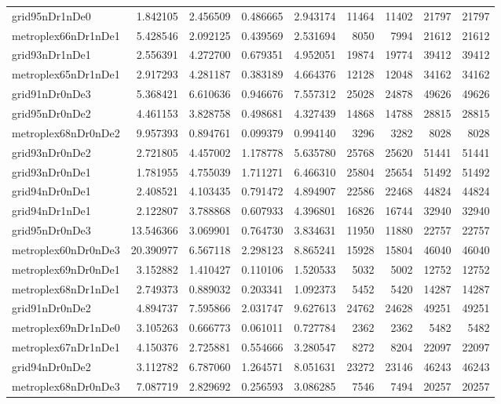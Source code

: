 \begin{longtable}{|l|r|r|r|r|r|r|r|r|}
grid95nDr1nDe0 & 1.842105 & 2.456509 & 0.486665 & 2.943174 & 11464 & 11402 & 21797 & 21797 \\
metroplex66nDr1nDe1 & 5.428546 & 2.092125 & 0.439569 & 2.531694 & 8050 & 7994 & 21612 & 21612 \\
grid93nDr1nDe1 & 2.556391 & 4.272700 & 0.679351 & 4.952051 & 19874 & 19774 & 39412 & 39412 \\
metroplex65nDr1nDe1 & 2.917293 & 4.281187 & 0.383189 & 4.664376 & 12128 & 12048 & 34162 & 34162 \\
grid91nDr0nDe3 & 5.368421 & 6.610636 & 0.946676 & 7.557312 & 25028 & 24878 & 49626 & 49626 \\
grid95nDr0nDe2 & 4.461153 & 3.828758 & 0.498681 & 4.327439 & 14868 & 14788 & 28815 & 28815 \\
metroplex68nDr0nDe2 & 9.957393 & 0.894761 & 0.099379 & 0.994140 & 3296 & 3282 & 8028 & 8028 \\
grid93nDr0nDe2 & 2.721805 & 4.457002 & 1.178778 & 5.635780 & 25768 & 25620 & 51441 & 51441 \\
grid93nDr0nDe1 & 1.781955 & 4.755039 & 1.711271 & 6.466310 & 25804 & 25654 & 51492 & 51492 \\
grid94nDr0nDe1 & 2.408521 & 4.103435 & 0.791472 & 4.894907 & 22586 & 22468 & 44824 & 44824 \\
grid94nDr1nDe1 & 2.122807 & 3.788868 & 0.607933 & 4.396801 & 16826 & 16744 & 32940 & 32940 \\
grid95nDr0nDe3 & 13.546366 & 3.069901 & 0.764730 & 3.834631 & 11950 & 11880 & 22757 & 22757 \\
metroplex60nDr0nDe3 & 20.390977 & 6.567118 & 2.298123 & 8.865241 & 15928 & 15804 & 46040 & 46040 \\
metroplex69nDr0nDe1 & 3.152882 & 1.410427 & 0.110106 & 1.520533 & 5032 & 5002 & 12752 & 12752 \\
metroplex68nDr1nDe1 & 2.749373 & 0.889032 & 0.203341 & 1.092373 & 5452 & 5420 & 14287 & 14287 \\
grid91nDr0nDe2 & 4.894737 & 7.595866 & 2.031747 & 9.627613 & 24762 & 24628 & 49251 & 49251 \\
metroplex69nDr1nDe0 & 3.105263 & 0.666773 & 0.061011 & 0.727784 & 2362 & 2362 & 5482 & 5482 \\
metroplex67nDr1nDe1 & 4.150376 & 2.725881 & 0.554666 & 3.280547 & 8272 & 8204 & 22097 & 22097 \\
grid94nDr0nDe2 & 3.112782 & 6.787060 & 1.264571 & 8.051631 & 23272 & 23146 & 46243 & 46243 \\
metroplex68nDr0nDe3 & 7.087719 & 2.829692 & 0.256593 & 3.086285 & 7546 & 7494 & 20257 & 20257 \\

\end{longtable}
